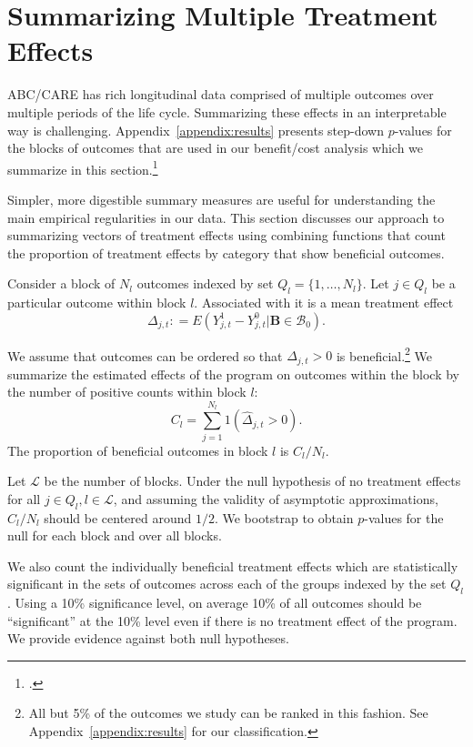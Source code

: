 \section{Summarizing Multiple Treatment Effects} \label{section:methodology}

ABC/CARE has rich longitudinal data comprised of multiple outcomes over multiple periods of the life cycle. Summarizing these effects in an interpretable way is challenging. Appendix~\ref{appendix:results} presents step-down $p$-values for the blocks of outcomes that are used in our benefit/cost analysis which we summarize in this section.\footnote{\citet{Lehman_Romano_2005_AnnStat,Romano_Shaikh_2006_AnnStat}.}

Simpler, more digestible summary measures are useful for understanding the main empirical regularities in our data. This section discusses our approach to summarizing vectors of treatment effects using combining functions that count the proportion of treatment effects by category that show beneficial outcomes.

Consider a block of $N_l$ outcomes indexed by set $Q_l = \{1,\dots,N_l\}$. Let $j \in Q_l$ be a particular outcome within block $l$. Associated with it is a mean treatment effect
\begin{equation}
\Delta_{j,t} : = E(Y^1_{j,t} - Y^0_{j,t} | \bm{B} \in \mathcal{B}_0).
\end{equation}

We assume that outcomes can be ordered so that $\Delta_{j,t} >0$ is beneficial.\footnote{All but 5\% of the outcomes we study can be ranked in this fashion. See Appendix~\ref{appendix:results} for our classification.} We summarize the estimated effects of the program on outcomes within the block by the number of positive counts within block $l$:
\begin{equation}
C_l = \sum^{N_l}_{j=1} 1 (\hat{\Delta}_{j,t} >0).
\end{equation}
The proportion of beneficial outcomes in block $l$ is $C_l / N_l$.

Let $\mathcal{L}$ be the number of blocks. Under the null hypothesis of no treatment effects for all $j \in Q_l, l \in \mathcal{L}$, and assuming the validity of asymptotic approximations, $C_l / N_l$ should be centered around $1/2$. We bootstrap to obtain $p$-values for the null for each block and over all blocks.

We also count the individually beneficial treatment effects which are statistically significant in the sets of outcomes across each of the groups indexed by the set $Q_l$. Using a 10\% significance level, on average 10\% of all outcomes should be ``significant'' at the 10\% level even if there is no treatment effect of the program. We provide evidence against both null hypotheses. 

